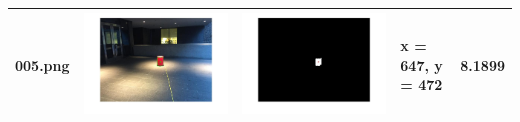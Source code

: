 \documentclass[fleqn,10pt]{SelfArx} %
\begin{document}
\begin{table}
\begin{tabular}{>{\centering\arraybackslash}M{15mm}cc>{\centering\arraybackslash}M{11mm}>{\centering\arraybackslash}M{15mm}}
\vspace{-4cm}005.png & \includegraphics[trim={3cm 2cm 3cm 2cm},clip,scale=0.28]{results/005.jpg} & \includegraphics[trim={3cm 2cm 3cm 2cm},clip,scale=0.41]{results/005s.jpg} & \vspace{-4cm} x = 647, y = 472 & \vspace{-4cm}8.1899 \\ 
\hline 
\end{tabular} 
\label{tab:results}
\end{table}
\end{document}
